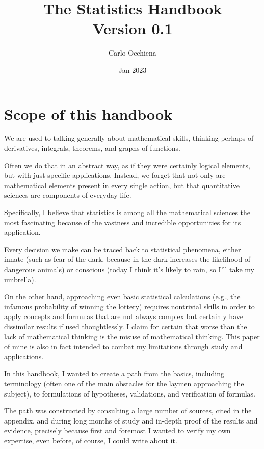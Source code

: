 \documentclass{article}
\title{The Statistics Handbook \\ 
    \normalsize Version 0.1}
\author{ Carlo Occhiena }
\date{ Jan 2023 }
\begin{document}
\fancyhead{}
\setlength{\headheight}{13.6pt}
\pagestyle{fancy}
\rhead[]{\rightmark} %

\maketitle
\tableofcontents
\clearpage

\section{Scope of this handbook}
We are used to talking generally about mathematical skills, thinking perhaps of derivatives, integrals, theorems, and graphs of functions. 

Often we do that in an abstract way, as if they were certainly logical elements, but with just specific applications. Instead, we forget that not only are mathematical elements present in every single action, but that quantitative sciences are components of everyday life.

Specifically, I believe that statistics is among all the mathematical sciences the most fascinating because of the vastness and incredible opportunities for its application. 

Every decision we make can be traced back to statistical phenomena, either innate (such as fear of the dark, because in the dark increases the likelihood of dangerous animals) or conscious (today I think it's likely to rain, so I'll take my umbrella). 

On the other hand, approaching even basic statistical calculations (e.g., the infamous probability of winning the lottery) requires nontrivial skills in order to apply concepts and formulas that are not always complex but certainly have dissimilar results if used thoughtlessly. I claim for certain that worse than the lack of mathematical thinking is the misuse of mathematical thinking. This paper of mine is also in fact intended to combat my limitations through study and applications. 

In this handbook, I wanted to create a path from the basics, including terminology (often one of the main obstacles for the laymen approaching the subject), to formulations of hypotheses, validations, and verification of formulas.

The path was constructed by consulting a large number of sources, cited in the appendix, and during long months of study and in-depth proof of the results and evidence, precisely because first and foremost I wanted to verify my own expertise, even before, of course, I could write about it. 
\end{document}
